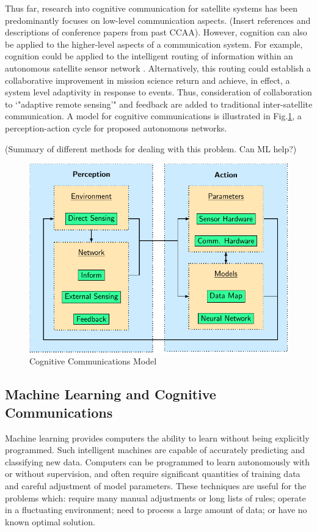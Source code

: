 \documentclass[conference]{IEEEtran}
\begin{document}
Thus far, research into cognitive communication for satellite systems has been predominantly focuses on low-level communication aspects.  {\color{red} (Insert references and descriptions of conference papers from past CCAA)}.  However, cognition can also be applied to the higher-level aspects of a communication system.  For example, cognition could be applied to the intelligent routing of information within an autonomous satellite sensor network \cite{ref7}.  Alternatively, this routing could establish a collaborative improvement in mission science return and achieve, in effect, a system level adaptivity in response to events.  Thus, consideration of collaboration to `"adaptive remote sensing'" and feedback are added to traditional inter-satellite communication.  A model for cognitive communications is illustrated in Fig.\ref{fig:model}, a perception-action cycle for proposed autonomous networks.

{\color{red} (Summary of different methods for dealing with this problem. Can ML help?)}

\begin{figure}[t]
  \centerline{\includegraphics[width=0.9\linewidth]
    {images/working/flowchart.pdf}
  }
  \caption{Cognitive Communications Model}
  \label{fig:model}
\end{figure}

\vfill

\subsection{Machine Learning and Cognitive Communications}
\label{ssec:ml}

Machine learning provides computers the ability to learn without being explicitly programmed.  Such intelligent machines are capable of accurately predicting and classifying new data.  Computers can be programmed to learn autonomously with or without supervision, and often require significant quantities of training data and careful adjustment of model parameters.  These techniques are useful for the problems which: require many manual adjustments or long lists of rules; operate in a fluctuating environment; need to process a large amount of data; or have no known optimal solution.
\end{document}
